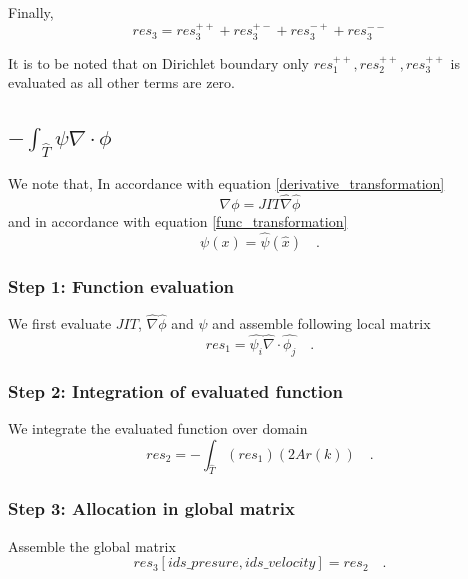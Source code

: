 \documentclass[a4paper,openany]{book}
\begin{document}
Finally,
\begin{equation}
res_3 = res_3^{++} + res_3^{+-} + res_3^{-+} + res_3^{--} 
\end{equation}

It is to be noted that on Dirichlet boundary only $res_1^{++}, res_2^{++}, res_3^{++}$ is evaluated as all other terms are zero.

\subsection{$-\int_{\hat{T}} \psi \nabla \cdot \phi$}

We note that, In accordance with equation \ref{derivative_transformation}
\begin{equation}
\nabla \phi = JIT \hat{\nabla} \hat{\phi}
\end{equation}
and in accordance with equation \ref{func_transformation}
\begin{equation}
\psi(x) = \hat{\psi} (\hat{x}) \quad \textrm{.}
\end{equation}

\subsubsection{Step 1: Function evaluation}
We first evaluate $JIT$, $\hat{\nabla} \hat{\phi}$ and $\psi$ and assemble following local matrix\\
\begin{equation}
res_1 = \hat{\psi_i} \hat{\nabla} \cdot \hat{\phi_j} \quad \textrm{.}
\end{equation}

\subsubsection{Step 2: Integration of evaluated function}
We integrate the evaluated function over domain\\
\begin{equation}
res_2 = -\int_{\hat{T}} (res_1) (2 Ar(k)) \quad \textrm{.}
\end{equation}

\subsubsection{Step 3: Allocation in global matrix}

Assemble the global matrix\\
\begin{equation}
res_3[ids\_presure,ids\_velocity] = res_2 \quad \textrm{.}
\end{equation}
\end{document}
